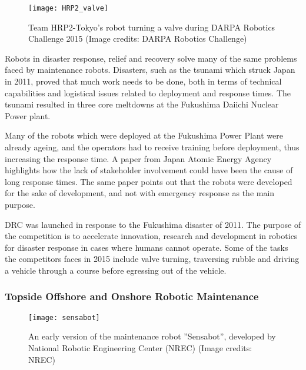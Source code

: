 \begin{wrapfigure}{r}{0.5\textwidth}
	\begin{center}
		\texttt{[image: HRP2\_valve]}
	\end{center}
	
	\caption{Team HRP2-Tokyo's robot turning a valve during DARPA Robotics Challenge 2015 (Image credits: DARPA Robotics Challenge)}
\end{wrapfigure}

Robots in disaster response, relief and recovery solve many of the same problems faced by maintenance robots. Disasters, such as the tsunami which struck Japan in 2011, proved that much work needs to be done, both in terms of technical capabilities and logistical issues related to deployment and response times. The tsunami resulted in three core meltdowns at the Fukushima Daiichi Nuclear Power plant.

Many of the robots which were deployed at the Fukushima Power Plant were already ageing, and the operators had to receive training before deployment, thus increasing the response time\cite{doi:10.1108/01439911211249715}. A paper from Japan Atomic Energy Agency\cite{doi:10.1108/01439911211249715} highlights how the lack of stakeholder involvement could have been the cause of long response times. The same paper points out that the robots were developed for the sake of development, and not with emergency response as the main purpose\cite{doi:10.1108/01439911211249715}. 

\ac{DRC}\cite{DRC} was launched in response to the Fukushima disaster of 2011. The purpose of the competition is to accelerate innovation, research and development in robotics for disaster response in cases where humans cannot operate. Some of the tasks the competitors faces in 2015 include valve turning, traversing rubble and driving a vehicle through a course before egressing out of the vehicle.

\subsubsection{Topside Offshore and Onshore Robotic Maintenance}

\begin{wrapfigure}{l}{0.45\textwidth}
	\begin{center}
		\texttt{[image: sensabot]}
	\end{center}
	
	\caption{An early version of the maintenance robot ''Sensabot'', developed by National Robotic Engineering Center (NREC) (Image credits: NREC)}
	\vspace{-20pt}
\end{wrapfigure} 

